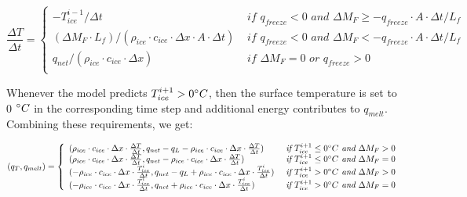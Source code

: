 \documentclass[utf8]{frontiersSCNS} %
\begin{document}
\begin{equation} \frac{\Delta T}{\Delta t} = \left\{ \begin{array}{ll} -T_{ice}^{i-1}/\Delta t & \textit{ if }
     q_{freeze} < 0 \textit{ and } \Delta M_{F} \geq -q_{freeze}\cdot A \cdot \Delta t/L_f  \\ (\Delta M_{F}
    \cdot L_f )/(\rho_{ice} \cdot c_{ice} \cdot  \Delta x \cdot A \cdot \Delta t) & \textit{ if }  q_{freeze}< 0
    \textit{ and } \Delta M_{F} < -q_{freeze}\cdot A \cdot \Delta t/L_f  \\ q_{net}/ (\rho_{ice}\cdot c_{ice}
    \cdot \Delta x)& \textit{ if } \Delta M_{F} = 0 \textit{ or }  q_{freeze}> 0\\
    \end{array} \right.  \label{eqn:T} \end{equation}

Whenever the model predicts $T_{ice}^{i+1} > 0 \degree C$, then the surface temperature is set to 0 $\degree C$ in the
corresponding time step and additional energy contributes to $q_{melt}$. Combining these requirements, we get:

\begin{equation} (q_{T}, q_{melt}) = \left\{ \begin{array}{ll} ( \rho_{ice} \cdot c_{ice} \cdot  \Delta x \cdot
    \frac{\Delta T}{\Delta t}, q_{net}-q_{L}-\rho_{ice} \cdot c_{ice} \cdot  \Delta x \cdot \frac{\Delta T}{\Delta t})
    & \textit{ if } T_{ice}^{i+1}\leq 0 \degree C \textit{ and } \Delta M_{F} > 0\\ ( \rho_{ice} \cdot c_{ice} \cdot  \Delta x
    \cdot \frac{\Delta T}{\Delta t}, q_{net}-\rho_{ice} \cdot c_{ice} \cdot  \Delta x \cdot \frac{\Delta T}{\Delta t})
    & \textit{ if } T_{ice}^{i+1}\leq 0 \degree C \textit{ and } \Delta M_{F} = 0\\
        ( -\rho_{ice} \cdot c_{ice} \cdot  \Delta x \cdot \frac{T_{ice}^{i}}{\Delta t}, q_{net}-q_{L}+\rho_{ice} \cdot
    c_{ice} \cdot \Delta x \cdot \frac{T_{ice}^{i}}{\Delta t}) & \textit{ if } T_{ice}^{i+1}> 0 \degree C \textit{ and } \Delta
    M_{F} > 0\\ ( -\rho_{ice} \cdot c_{ice} \cdot  \Delta x \cdot \frac{T_{ice}^{i}}{\Delta t}, q_{net}+\rho_{ice}
    \cdot c_{ice} \cdot  \Delta x \cdot \frac{T_{ice}^{i}}{\Delta t}) & \textit{ if } T_{ice}^{i+1}> 0 \degree C \textit{ and }
\Delta M_{F} = 0\\ \end{array} \right.  \label{eqn:qt} \end{equation}
\end{document}
